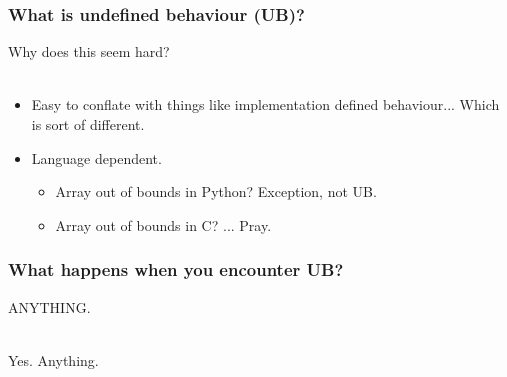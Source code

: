 \documentclass[handout]{beamer}
\begin{document}
\begin{frame}
  \frametitle{What is undefined behaviour (UB)?}

  Why does this seem hard?\\~

  \pause
  \begin{itemize}
\item Easy to conflate with things like implementation defined
  behaviour... Which is sort of different.
  \pause
\item Language dependent.
  \begin{itemize}
  \item  Array out of bounds in Python? Exception, not UB.
    \pause
  \item Array out of bounds in C? ... Pray.
  \end{itemize}
  \end{itemize}
\end{frame}

\begin{frame}
  \frametitle{What happens when you encounter UB?}

  \pause

  {\huge ANYTHING.}\\~

  \pause

  {\huge Yes. \pause Anything.}\\~
  
\end{frame}
\end{document}
